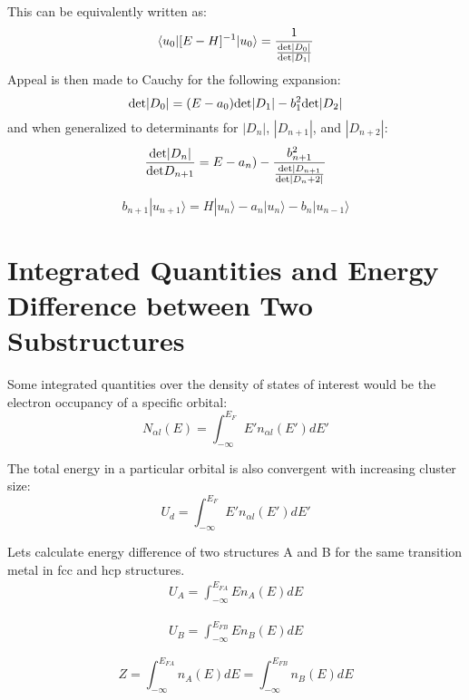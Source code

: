 \documentclass{article}
\def\ket{\rangle}
\def\bra{\langle}
\begin{document}
This can be equivalently written as:
%
\begin{equation}
\bra u_{0}|[E-H]^{-1}|u_{0}\ket = \frac{1}{\frac{{\rm det}|D_{0}|}{{\rm det}|D_{1}|}}
\end{equation}
%
Appeal is then made to Cauchy for the following expansion:
%
\begin{equation}
{\rm det}|D_{0}| = (E-a_{0}){\rm det}|D_{1}| - b^{2}_{1}{\rm det}|D_{2}|
\end{equation}
%
and when generalized to determinants for $|D_{n}|$, $|D_{n+1}|$, and $|D_{n+2}|$:
%
\begin{equation}
\frac{{\rm det}|D_{n}|}{{\rm det} D_{n+1}} = E-a_{n}) - \frac{b^{2}_{n+1}}{\frac{{\rm det}|D_{n+1}}{{\rm det}|D_n+2|}}
\end{equation}

\begin{equation}
b_{n+1}|u_{n+1}\ket = H |u_{n}\ket - a_{n}|u_{n}\ket - b_{n}|u_{n-1}\ket
\end{equation}

\section{Integrated Quantities and Energy Difference between Two Substructures}
Some integrated quantities over the density of states of interest would be
the electron occupancy of a specific orbital:
%
\begin{equation}
N_{\alpha l}(E) = \int_{-\infty}^{E_{F}}E' n_{\alpha l}(E') dE'
\end{equation}

The total energy in a particular orbital is also convergent with increasing cluster size:
%
\begin{equation}
U_{d} = \int_{-\infty}^{E_{F}}E'n_{\alpha l}(E') dE'
\end{equation}
%

Lets calculate energy difference of two structures A and B for the same transition metal
in fcc and hcp structures.
%
\begin{eqnarray}
\label{eq:Ua}
U_{A} = \int_{-\infty}^{E_{FA}} E n_{A}(E) dE
\end{eqnarray}

\begin{eqnarray}
\label{eq:Ub}
U_{B} = \int_{-\infty}^{E_{FB}} E n_{B}(E) dE
\end{eqnarray}

\begin{equation}
\label{eq:totaldos}
Z = \int_{-\infty}^{E_{FA}} n_{A}(E)dE = \int_{-\infty}^{E_{FB}}n_{B}(E)dE
\end{equation}
\end{document}
